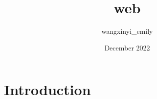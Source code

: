 \documentclass{article}
\title{web}
\author{wangxinyi_emily }
\date{December 2022}
\begin{document}
\maketitle

\section{Introduction}
\end{document}

